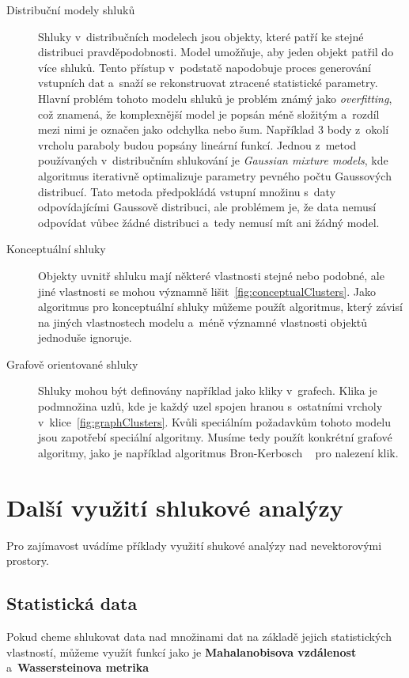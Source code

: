 \begin{description}
\item[Distribuční modely shluků] Shluky v~distribučních modelech jsou objekty, kte\-ré patří ke stejné distribuci pravděpodobnosti. Model umožňuje, aby jeden objekt patřil do více shluků.
Tento přístup v~podstatě napodobuje proces generování vstupních dat a~sna\-ží se rekonstruovat ztracené statistické parametry. Hlavní problém tohoto modelu shluků je problém známý jako \textit{overfitting}, což znamená, že komplexnější model je popsán méně složitým a~rozdíl mezi nimi je označen jako odchylka nebo šum. Například 3 body z~okolí vrcholu paraboly budou popsány lineární funkcí.
Jednou z~metod používaných v~distribučním shlukování je \textit {Gaussian mixture models}, kde algoritmus iterativně optimalizuje parametry pevného počtu Gaussových distribucí.
Tato metoda předpokládá vstupní množinu s~daty odpovídajícími Gaussově distribuci, ale problémem je, že data nemusí od\-po\-ví\-dat vůbec žádné distribuci a~tedy nemusí mít ani žádný model.

\item[Konceptuální shluky] Objekty uvnitř shluku mají některé vlastnosti stejné nebo podobné, ale jiné vlastnosti se mohou významně lišit~\autoref{fig:conceptualClusters}.
Jako algoritmus pro konceptuální shluky můžeme použít algoritmus, který závisí na jiných vlastnostech modelu a~méně významné vlastnosti objektů jednoduše ignoruje.

\item[Grafově orientované shluky] Shluky mohou být definovány například jako kli\-ky v~grafech. Klika je podmnožina uzlů, kde je každý uzel spojen hranou s~ostatními vrcholy v~klice~\autoref{fig:graphClusters}.
Kvůli speciálním požadavkům tohoto modelu jsou zapotřebí speciální algoritmy. Musíme tedy použít konkrétní grafové algoritmy, jako je například algoritmus Bron-Kerbosch ~\cite{Sun15} pro nalezení klik.
\end{description}

\section{Další využití shlukové analýzy} \label{sec:otherdata}
Pro zajímavost uvádíme příklady využití shukové analýzy nad nevektorovými prostory.

\subsection{Statistická data}
Pokud cheme shlukovat data nad množinami dat na základě jejich statistických vlastností, můžeme využít funkcí jako je \textbf{Mahalanobisova vzdálenost} a~\textbf{Wassersteinova metrika}

